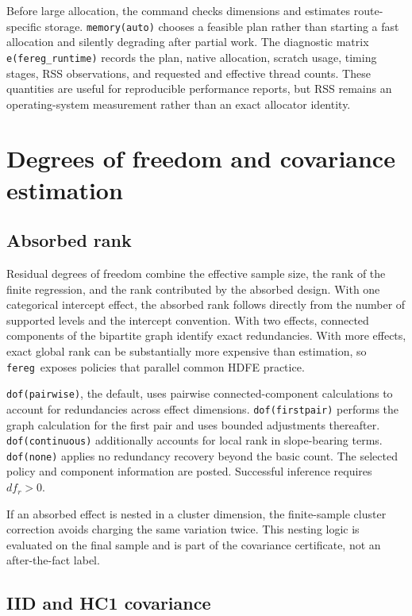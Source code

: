\documentclass[11pt]{article}
\newcommand{\fereg}{\texttt{fereg}}
\begin{document}
Before large allocation, the command checks dimensions and estimates
route-specific storage.  \texttt{memory(auto)} chooses a feasible plan rather
than starting a fast allocation and silently degrading after partial work.
The diagnostic matrix \texttt{e(fereg\_runtime)} records the plan, native
allocation, scratch usage, timing stages, RSS observations, and requested and
effective thread counts.  These quantities are useful for reproducible
performance reports, but RSS remains an operating-system measurement rather
than an exact allocator identity.

\section{Degrees of freedom and covariance estimation}
\label{sec:inference}

\subsection{Absorbed rank}

Residual degrees of freedom combine the effective sample size, the rank of
the finite regression, and the rank contributed by the absorbed design.  With
one categorical intercept effect, the absorbed rank follows directly from
the number of supported levels and the intercept convention.  With two
effects, connected components of the bipartite graph identify exact
redundancies.  With more effects, exact global rank can be substantially more
expensive than estimation, so \fereg\ exposes policies that parallel common
HDFE practice.

\texttt{dof(pairwise)}, the default, uses pairwise connected-component
calculations to account for redundancies across effect dimensions.
\texttt{dof(firstpair)} performs the graph calculation for the first pair and
uses bounded adjustments thereafter.  \texttt{dof(continuous)} additionally
accounts for local rank in slope-bearing terms.  \texttt{dof(none)} applies
no redundancy recovery beyond the basic count.  The selected policy and
component information are posted.  Successful inference requires
$df_r>0$.

If an absorbed effect is nested in a cluster dimension, the finite-sample
cluster correction avoids charging the same variation twice.  This nesting
logic is evaluated on the final sample and is part of the covariance
certificate, not an after-the-fact label.

\subsection{IID and HC1 covariance}
\end{document}
